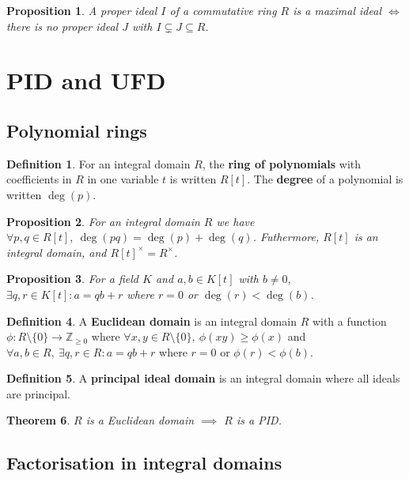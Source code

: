 \documentclass[12pt]{article}
\newtheorem{thm}{Theorem}[section]
\newtheorem{prop}[thm]{Proposition}
\theoremstyle{definition}
\newtheorem{defn}[thm]{Definition}
\newtheorem*{defn*}{Definition}
\newcommand{\Z}{\mathbb{Z}}
\begin{document}
\begin{prop}
  A proper ideal $I$ of a commutative ring $R$ is a maximal ideal $\iff$ there is no proper ideal $J$ with $I \subsetneq J \subseteq R$.
\end{prop}

\section{PID and UFD}

\subsection{Polynomial rings}

\begin{defn*}
  For an integral domain $R$, the \textbf{ring of polynomials} with coefficients in $R$ in one variable $t$ is written $R[t]$.
  The \textbf{degree} of a polynomial is written $\deg(p)$.
\end{defn*}

\begin{prop}
  For an integral domain $R$ we have $\forall p, q \in R[t],\ \deg(pq) = \deg(p) + \deg(q)$.
  Futhermore, $R[t]$ is an integral domain, and $R[t]^{\times} = R^{\times}$.
\end{prop}

\begin{prop}
  For a field $K$ and $a, b \in K[t]$ with $b \neq 0$, $\exists q, r \in K[t] : a = qb + r$ where $r = 0$ or $\deg(r) < \deg(b)$.
\end{prop}

\begin{defn}
  A \textbf{Euclidean domain} is an integral domain $R$ with a function $\phi : R \setminus \{0\} \to \Z_{\geq 0}$ where $\forall x, y \in R \setminus \{0\},\ \phi(xy) \geq \phi(x)$ and $\forall a, b \in R,\ \exists q, r \in R : a = qb + r$ where $r = 0$ or $\phi(r) < \phi(b)$.
\end{defn}

\begin{defn}
  A \textbf{principal ideal domain} is an integral domain where all ideals are principal.
\end{defn}

\begin{thm}
  $R$ is a Euclidean domain $\implies$ $R$ is a PID.
\end{thm}

\subsection{Factorisation in integral domains}
\end{document}
